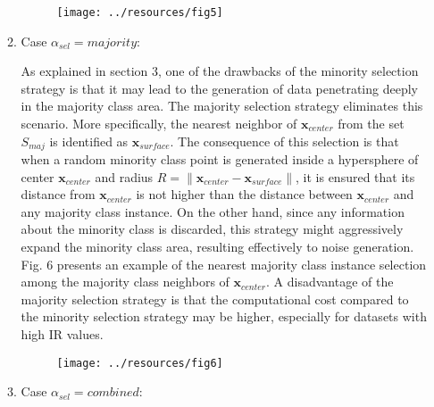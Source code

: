 \documentclass[parskip=full]{scrartcl}
\begin{document}
\begin{enumerate}
\begin{enumerate}
	\begin{figure}[H]
		\centering
		\texttt{[image: ../resources/fig5]}
	\end{figure}

	\item Case \( \alpha_{sel} = majority \):

	As explained in section 3, one of the drawbacks of the minority selection strategy is that it may lead to the generation of data penetrating deeply in the majority class area. The majority selection strategy eliminates this scenario. More specifically, the nearest neighbor of \( \textbf{x}_{center} \) from the set \( S_{maj} \) is identified as \( \textbf{x}_{surface} \). The consequence of this selection is that when a random minority class point is generated inside a hypersphere of center \( \textbf{x}_{center} \) and radius \( R = \| \textbf{x}_{center} - \textbf{x}_{surface} \| \), it is ensured that its distance from \( \textbf{x}_{center} \) is not higher than the distance between \( \textbf{x}_{center} \) and any majority class instance. On the other hand, since any information about the minority class is discarded, this strategy might aggressively expand the minority class area, resulting effectively to noise generation. Fig. 6 presents an example of the nearest majority class instance selection among the majority class neighbors of \( \textbf{x}_{center} \). A disadvantage of the majority selection strategy is that the computational cost compared to the minority selection strategy may be higher, especially for datasets with high IR values.

	\begin{figure}[H]
		\centering
		\texttt{[image: ../resources/fig6]}
	\end{figure}

	\item Case \( \alpha_{sel} = combined \):


\end{enumerate}
\end{enumerate}
\end{document}
